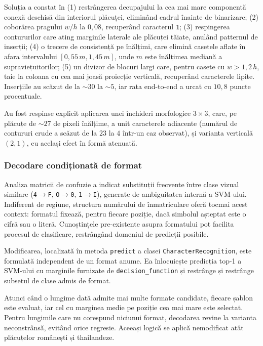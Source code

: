 Soluția a constat în (1) restrângerea decupajului la cea mai mare componentă conexă deschisă din interiorul plăcuței, eliminând cadrul înainte de binarizare; (2) coborârea pragului $w/h$ la $0{,}08$, recuperând caracterul \texttt{1}; (3) respingerea contururilor care ating marginile laterale ale plăcuței tăiate, anulând patternul de inserții; (4) o trecere de consistență pe înălțimi, care elimină casetele aflate în afara intervalului $[0{,}55\,m, 1{,}45\,m]$, unde $m$ este înălțimea mediană a supraviețuitorilor; (5) un divizor de blocuri largi care, pentru casete cu $w > 1{,}2\,h$, taie la coloana cu cea mai joasă proiecție verticală, recuperând caracterele lipite. Inserțiile au scăzut de la $\sim 30$ la $\sim 5$, iar rata end-to-end a urcat cu $10{,}8$ puncte procentuale.

Au fost respinse explicit aplicarea unei închideri morfologice $3\times3$, care, pe plăcuțe de $\sim 27$ de pixeli înălțime, a unit caracterele adiacente (numărul de contururi crude a scăzut de la $23$ la $4$ într-un caz observat), și varianta verticală $(2,1)$, cu același efect în formă atenuată.

\subsubsection{Decodare condiționată de format}
\indent\par
Analiza matricii de confuzie a indicat substituții frecvente între clase vizual similare (\texttt{4}$\to$\texttt{F}, \texttt{O}$\to$\texttt{0}, \texttt{1}$\to$\texttt{I}), generate de ambiguitatea internă a SVM-ului. Indiferent de regiune, structura numărului de înmatriculare oferă tocmai acest context: formatul fixează, pentru fiecare poziție, dacă simbolul așteptat este o cifră sau o literă. Cunoștințele pre-existente asupra formatului pot facilita procesul de clasificare, restrângând domeniul de predicții posibile.

Modificarea, localizată în metoda \texttt{predict} a clasei \texttt{CharacterRecognition}, este formulată independent de un format anume. Ea înlocuiește predicția top-1 a SVM-ului cu marginile furnizate de \texttt{decision\_function} și restrânge și restrânge subsetul de clase admis de format.

Atunci când o lungime dată admite mai multe formate candidate, fiecare șablon este evaluat, iar cel cu marginea medie pe poziție cea mai mare este selectat. Pentru lungimile care nu corespund niciunui format, decodarea revine la varianta neconstrânsă, evitând orice regresie. Aceeași logică se aplică nemodificat atât plăcuțelor românești și thailandeze.

